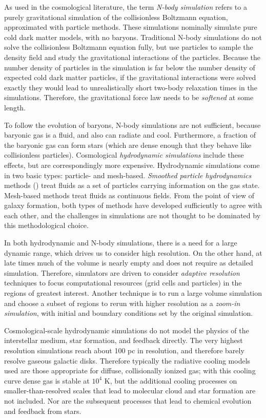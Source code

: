As used in the cosmological literature, the term {\it N-body
simulation} refers to a purely gravitational simulation of the
collisionless Boltzmann equation, approximated with particle
methods. These simulations nominally simulate pure cold dark matter
models, with no baryons. Traditional N-body simulations do not solve
the collisionless Boltzmann equation fully, but use particles to
sample the density field and study the gravitational interactions of
the particles. Because the number density of particles in the
simulation is far below the number density of expected cold dark
matter particles, if the gravitational interactions were solved
exactly they would lead to unrealistically short two-body relaxation
times in the simulations. Therefore, the gravitational force law needs
to be {\it softened} at some length.

To follow the evolution of baryons, N-body simulations are not
sufficient, because baryonic gas is a fluid, and also can radiate and
cool. Furthermore, a fraction of the baryonic gas can form stars
(which are dense enough that they behave like collisionless
particles). Cosmological {\it hydrodynamic simulations} include these
effects, but are correspondingly more expensive. Hydrodynamic
simulations come in two basic types: particle- and mesh-based. {\it
Smoothed particle hydrodynamics} methods (\citealt{springel10a}) treat
fluids as a set of particles carrying information on the gas
state. Mesh-based methods treat fluids as continuous
fields. From the point of view of galaxy formation, both types of
methods have developed sufficiently to agree with each other, and the
challenges in simulations are not thought to be dominated by this
methodological choice.

In both hydrodynamic and N-body simulations, there is a need for a
large dynamic range, which drives us to consider high resolution. On
the other hand, at late times much of the volume is nearly empty and
does not require as detailed simulation. Therefore, simulators are
driven to consider {\it adaptive resolution} techniques to focus
computational resources (grid cells and particles) in the regions of
greatest interest. Another technique is to run a large volume
simulation and choose a subset of regions to rerun with higher
resolution as a {\it zoom-in simulation}, with initial and boundary
conditions set by the original simulation.

Cosmological-scale hydrodynamic simulations do not model the physics
of the interstellar medium, star formation, and feedback directly. The
very highest resolution simulations reach about 100 pc in resolution,
and therefore barely resolve gaseous galactic disks. Therefore
typically the radiative cooling models used are those appropriate for
diffuse, collisionally ionized gas; with this cooling curve dense gas
is stable at $10^4$ K, but the additional cooling processes on
smaller-than-resolved scales that lead to molecular cloud and star
formation are not included. Nor are the subsequent processes that lead
to chemical evolution and feedback from stars.

